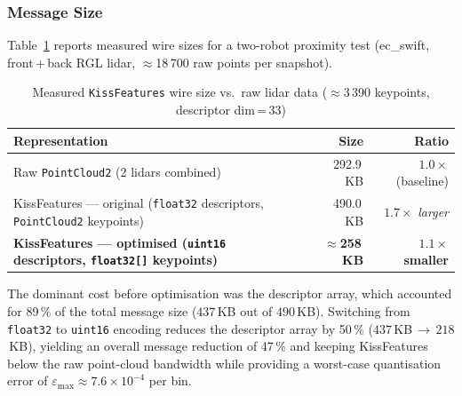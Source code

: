 \subsubsection*{Message Size}

Table~\ref{tab:kiss_size} reports measured wire sizes for a two-robot
proximity test (ec\_swift, front\,+\,back RGL lidar, $\approx$18\,700 raw
points per snapshot).

\begin{table}[h]
\centering
\caption{Measured \texttt{KissFeatures} wire size vs.\ raw lidar data
         ($\approx$3\,390 keypoints, descriptor dim\,=\,33)}
\label{tab:kiss_size}
\begin{tabular}{lrr}
\toprule
\textbf{Representation} & \textbf{Size} & \textbf{Ratio} \\
\midrule
Raw \texttt{PointCloud2} (2 lidars combined) & 292.9\,KB & $1.0\times$ (baseline) \\
KissFeatures --- original (\texttt{float32} descriptors, \texttt{PointCloud2} keypoints)
    & 490.0\,KB & $1.7\times$ \emph{larger} \\
\textbf{KissFeatures --- optimised (\texttt{uint16} descriptors, \texttt{float32[]} keypoints)}
    & \textbf{$\approx$258\,KB} & $\mathbf{1.1\times}$ \textbf{smaller} \\
\bottomrule
\end{tabular}
\end{table}

The dominant cost before optimisation was the descriptor array, which
accounted for 89\,\% of the total message size
($437$\,KB out of $490$\,KB).
Switching from \texttt{float32} to \texttt{uint16} encoding reduces the
descriptor array by 50\,\% ($437$\,KB\,$\to$\,$218$\,KB), yielding an overall
message reduction of 47\,\% and keeping KissFeatures below the raw
point-cloud bandwidth while providing a worst-case quantisation error of
$\varepsilon_{\max} \approx 7.6\times10^{-4}$ per bin.
